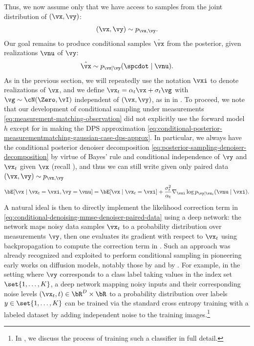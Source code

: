 \documentclass[../../book-main.tex]{subfiles}
\begin{document}
Thus, we now assume only that we have access to samples from the joint
distribution of $(\vx, \vy)$:
\begin{equation}
  (\vx, \vy) \sim p_{\vx, \vy}.
\end{equation}
Our goal remains to produce conditional samples $\hat{\vx}$ from the posterior,
given realizations $\vnu$ of $\vy$:
\begin{equation}
  \hat{\vx} \sim p_{\vx \mid \vy}(\spcdot \mid \vnu).
\end{equation}
As in the previous section, we will repeatedly use the notation $\vxi$ to denote
realizations of $\vx$, and we define $\vx_t = \alpha_t \vx + \sigma_t \vg$
with $\vg \sim \cN(\Zero, \vI)$ independent of $(\vx, \vy)$, as in
 in .
To proceed, we note that our development of conditional sampling under
measurements \eqref{eq:measurement-matching-observation} did not explicitly use
the forward model $h$ except for in making the DPS approximation
\eqref{eq:conditional-posterior-measurementmatching-gaussian-case-dps-approx}.
In particular, we always have the conditional posterior denoiser decomposition
\eqref{eq:posterior-sampling-denoiser-decomposition} by virtue of Bayes' rule
and conditional independence of $\vy$ and $\vx_t$ given $\vx$ (recall
), and thus we can
still write given only paired data $(\vx, \vy) \sim p_{\vx, \vy}$
\begin{equation}\label{eq:conditional-denoising-mmse-denoiser-paired-data}
  \bE[ \vx \mid \vx_t=\vxi, \vy=\vnu]
  =
  \bE[\vx \mid \vx_t=\vxi] + \frac{\sigma_t^2}{\alpha_t} \nabla_{\vxi}\log p_{\vy \mid \vx_t}(\vnu\mid
  \vxi).
\end{equation}
A natural ideal is then to directly implement the likelihood correction term in
\eqref{eq:conditional-denoising-mmse-denoiser-paired-data} using a deep network:
the network maps noisy data samples $\vx_t$ to a probability distribution over
measurements $\vy$, then one evaluates its gradient with respect to $\vx_t$
using backpropagation to compute the correction term in
.
Such an approach was already recognized and exploited to perform conditional
sampling in pioneering early works on diffusion models, notably those by
\citet{Sohl-Dickstein2015} and by \citet{song2020score}. For example, in the
setting where $\vy$ corresponds to a class label taking values in the index set
$\set{1, \dots, K}$, a deep network mapping noisy
inputs and their corresponding noise levels $(\vx_t, t) \in \bR^{D} \times
\bR$ to a probability distribution over labels $y \in \set{1, \dots, K}$ can be
trained via the standard cross entropy training with a labeled dataset by adding
independent noise to the training images.\footnote{In , we
discuss the process of training such a classifier in full detail.}
\end{document}
